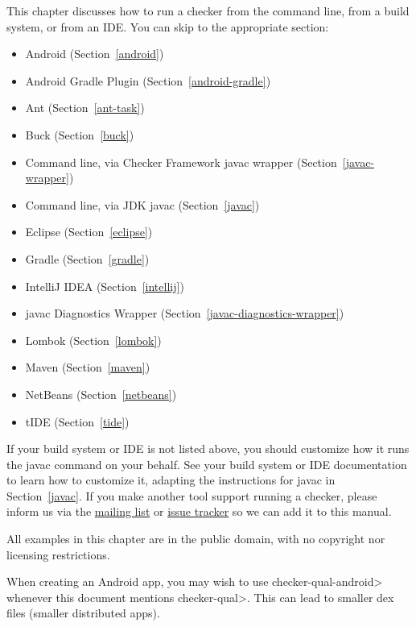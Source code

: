 \htmlhr
{}

This chapter discusses how to run a checker from the command line, from a
build system, or from an IDE\@.  You can skip to the appropriate section:

\begin{itemize}
\item Android (Section~\ref{android})
\item Android Gradle Plugin (Section~\ref{android-gradle})
\item Ant (Section~\ref{ant-task})
\item Buck (Section~\ref{buck})
\item Command line, via Checker Framework javac wrapper (Section~\ref{javac-wrapper})
\item Command line, via JDK javac (Section~\ref{javac})
\item Eclipse (Section~\ref{eclipse})
\item Gradle (Section~\ref{gradle})
\item IntelliJ IDEA (Section~\ref{intellij})
\item javac Diagnostics Wrapper (Section~\ref{javac-diagnostics-wrapper})
\item Lombok (Section~\ref{lombok})
\item Maven (Section~\ref{maven})
\item NetBeans (Section~\ref{netbeans})
\item tIDE (Section~\ref{tide})
\end{itemize}

If your build system or IDE is not listed above, you should customize how
it runs the javac command on your behalf.  See your build system or IDE
documentation to learn how to
customize it, adapting the instructions for javac in Section~\ref{javac}.
If you make another tool support running a checker, please
inform us via the
\href{https://groups.google.com/forum/#!forum/checker-framework-discuss}{mailing
  list} or
\href{https://github.com/typetools/checker-framework/issues}{issue tracker} so
we can add it to this manual.

All examples in this chapter are in the public domain, with no copyright nor
licensing restrictions.



When creating an Android app, you may wish to use \<checker-qual-android>
whenever this document mentions \<checker-qual>.  This can lead to smaller
dex files (smaller distributed apps).

